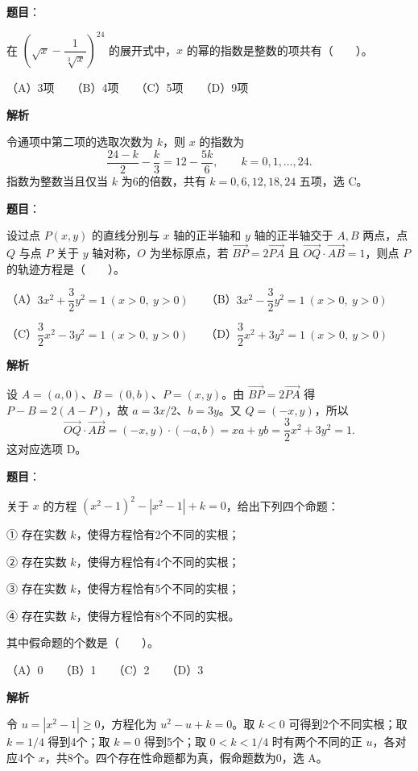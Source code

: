 \begin{answer}

\textbf{题目}：

在 $\left(\sqrt{x}-\dfrac{1}{\sqrt[3]{x}}\right)^{24}$ 的展开式中，$x$ 的幂的指数是整数的项共有\mbox{（　　）}。

（A）3项　　（B）4项　　（C）5项　　（D）9项

\textbf{解析}

令通项中第二项的选取次数为 $k$，则 $x$ 的指数为
\nopagebreak[4]
\[
\frac{24-k}{2}-\frac{k}{3}=12-\frac{5k}{6},\qquad k=0,1,\ldots,24.
\]
指数为整数当且仅当 $k$ 为6的倍数，共有 $k=0,6,12,18,24$ 五项，选 C。


\end{answer}
\begin{answer}

\textbf{题目}：

设过点 $P(x,y)$ 的直线分别与 $x$ 轴的正半轴和 $y$ 轴的正半轴交于 $A,B$ 两点，点 $Q$ 与点 $P$ 关于 $y$ 轴对称，$O$ 为坐标原点，若 $\overrightarrow{BP}=2\overrightarrow{PA}$ 且 $\overrightarrow{OQ}\cdot\overrightarrow{AB}=1$，则点 $P$ 的轨迹方程是\mbox{（　　）}。

（A）$3x^2+\dfrac32y^2=1\ (x>0,\ y>0)$　　（B）$3x^2-\dfrac32y^2=1\ (x>0,\ y>0)$

（C）$\dfrac32x^2-3y^2=1\ (x>0,\ y>0)$　　（D）$\dfrac32x^2+3y^2=1\ (x>0,\ y>0)$

\textbf{解析}

设 $A=(a,0)$、$B=(0,b)$、$P=(x,y)$。由 $\overrightarrow{BP}=2\overrightarrow{PA}$ 得 $P-B=2(A-P)$，故 $a=3x/2$、$b=3y$。又 $Q=(-x,y)$，所以
\nopagebreak[4]
\[
\overrightarrow{OQ}\cdot\overrightarrow{AB}=(-x,y)\cdot(-a,b)=xa+yb=\frac32x^2+3y^2=1.
\]
这对应选项 D。


\end{answer}
\begin{answer}

\textbf{题目}：

关于 $x$ 的方程 $(x^2-1)^2-|x^2-1|+k=0$，给出下列四个命题：

① 存在实数 $k$，使得方程恰有2个不同的实根；

② 存在实数 $k$，使得方程恰有4个不同的实根；

③ 存在实数 $k$，使得方程恰有5个不同的实根；

④ 存在实数 $k$，使得方程恰有8个不同的实根。

其中假命题的个数是\mbox{（　　）}。

（A）0　　（B）1　　（C）2　　（D）3

\textbf{解析}

令 $u=|x^2-1|\geqslant0$，方程化为 $u^2-u+k=0$。取 $k<0$ 可得到2个不同实根；取 $k=1/4$ 得到4个；取 $k=0$ 得到5个；取 $0<k<1/4$ 时有两个不同的正 $u$，各对应4个 $x$，共8个。四个存在性命题都为真，假命题数为0，选 A。


\end{answer}
